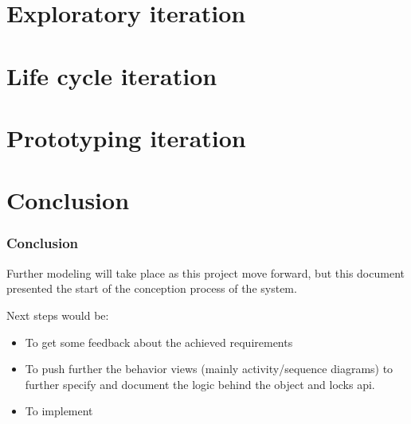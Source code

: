 \documentclass[a4paper,11pt]{article}
\author{%
    Léo-Nils Boissier \\
    \url{github.com/leonils}
}
\begin{document}


\tableofcontents
\newpage


\part{Exploratory iteration}







\newpage
\part{Life cycle iteration}








\newpage
\part{Prototyping iteration}






\newpage
\part{Conclusion}
\section{Conclusion}
Further modeling will take place as this project move forward, but this document presented the start of the conception process of the system.

Next steps would be:

\begin{itemize}
    \item To get some feedback about the achieved requirements
    \item To push further the behavior views (mainly activity/sequence diagrams) to further specify and document the logic behind the object and locks api.
    \item To implement
\end{itemize}
\end{document}
